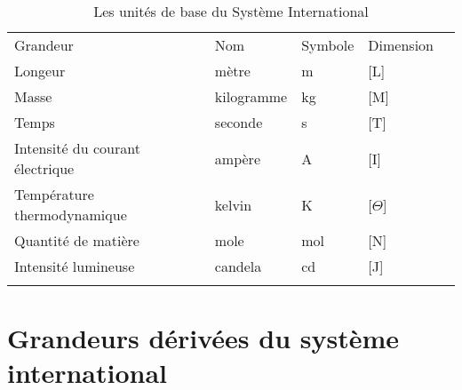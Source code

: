 \begin{table}[!h]
    \centering
    \begin{tabular*}{15cm}{M{6cm}M{2.5cm}M{2.5cm}M{2.5cm}N}
        \hhline{====}
        Grandeur & Nom & Symbole & Dimension \\
        \hhline{----}
        Longeur & mètre & \si{\meter} & [L] \\
        Masse & kilogramme & \si{\kilogram} & [M] \\
        Temps & seconde & \si{\second} & [T] \\
        Intensité du courant électrique & ampère & \si{\ampere} & [I] \\
        Température thermodynamique & kelvin & \si{\kelvin} & [$\Theta$] \\
        Quantité de matière & mole & \si{\mole} & [N] \\
        Intensité lumineuse & candela & \si{\candela} & [J] \\
        \hhline{====}
    \end{tabular*}
    \caption{Les unités de base du Système International}
\end{table}

\newpage
\section*{Grandeurs dérivées du système international}

